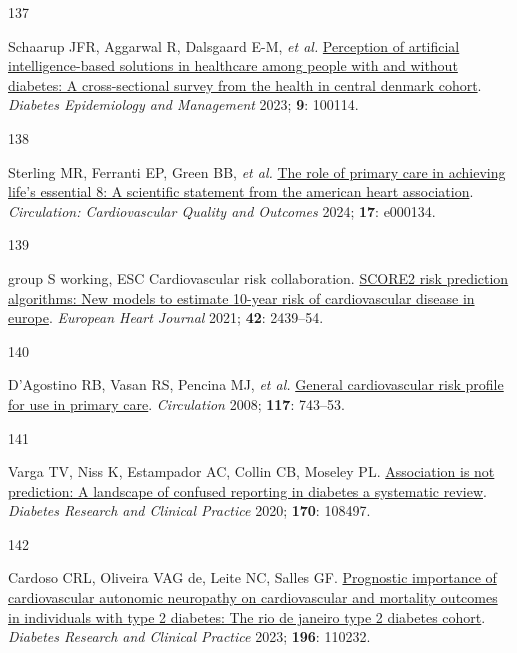 \documentclass[
  a4paper,
  headsepline=true,
  open=left]{scrbook}
\newlength{\cslhangindent}
\newlength{\csllabelwidth}
\newlength{\cslentryspacingunit} %
\newenvironment{CSLReferences}[2] %
 {%
  \setlength{\parindent}{0pt}
  \ifodd #1
  \let\oldpar\par
  \def\par{\hangindent=\cslhangindent\oldpar}
  \fi
  \setlength{\parskip}{#2\cslentryspacingunit}
 }%
 {}
\newcommand{\CSLLeftMargin}[1]{\parbox[t]{\csllabelwidth}{#1}}
\newcommand{\CSLRightInline}[1]{\parbox[t]{\linewidth - \csllabelwidth}{#1}\break}
\begin{document}
\begin{CSLReferences}{0}{0}
\leavevmode{}%
\CSLLeftMargin{137 }%
\CSLRightInline{Schaarup JFR, Aggarwal R, Dalsgaard E-M, \emph{et al.}
\href{https://doi.org/10.1016/j.deman.2022.100114}{Perception of
artificial intelligence-based solutions in healthcare among people with
and without diabetes: A cross-sectional survey from the health in
central denmark cohort}. \emph{Diabetes Epidemiology and Management}
2023; \textbf{9}: 100114.}

\leavevmode{}%
\CSLLeftMargin{138 }%
\CSLRightInline{Sterling MR, Ferranti EP, Green BB, \emph{et al.}
\href{https://doi.org/10.1161/HCQ.0000000000000134}{The role of primary
care in achieving life{'}s essential 8: A scientific statement from the
american heart association}. \emph{Circulation: Cardiovascular Quality
and Outcomes} 2024; \textbf{17}: e000134.}

\leavevmode{}%
\CSLLeftMargin{139 }%
\CSLRightInline{group S working, ESC Cardiovascular risk collaboration.
\href{https://doi.org/10.1093/eurheartj/ehab309}{SCORE2 risk prediction
algorithms: New models to estimate 10-year risk of cardiovascular
disease in europe}. \emph{European Heart Journal} 2021; \textbf{42}:
2439--54.}

\leavevmode{}%
\CSLLeftMargin{140 }%
\CSLRightInline{D'Agostino RB, Vasan RS, Pencina MJ, \emph{et al.}
\href{https://doi.org/10.1161/CIRCULATIONAHA.107.699579}{General
cardiovascular risk profile for use in primary care}. \emph{Circulation}
2008; \textbf{117}: 743--53.}

\leavevmode{}%
\CSLLeftMargin{141 }%
\CSLRightInline{Varga TV, Niss K, Estampador AC, Collin CB, Moseley PL.
\href{https://doi.org/10.1016/j.diabres.2020.108497}{Association is not
prediction: A landscape of confused reporting in diabetes {\textendash}
a systematic review}. \emph{Diabetes Research and Clinical Practice}
2020; \textbf{170}: 108497.}

\leavevmode{}%
\CSLLeftMargin{142 }%
\CSLRightInline{Cardoso CRL, Oliveira VAG de, Leite NC, Salles GF.
\href{https://doi.org/10.1016/j.diabres.2022.110232}{Prognostic
importance of cardiovascular autonomic neuropathy on cardiovascular and
mortality outcomes in individuals with type 2 diabetes: The rio de
janeiro type 2 diabetes cohort}. \emph{Diabetes Research and Clinical
Practice} 2023; \textbf{196}: 110232.}


\end{CSLReferences}
\end{document}
